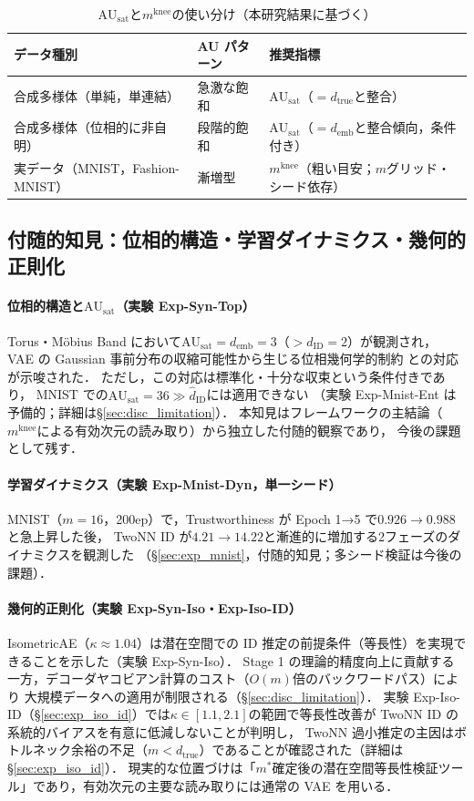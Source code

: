 \documentclass[11pt,a4paper]{jsarticle}
\newcommand{\dID}{d_{\mathrm{ID}}}
\newcommand{\dzopt}{m^*}
\newcommand{\dtrue}{d_{\mathrm{true}}}
\newcommand{\kap}{\kappa}
\newcommand{\AUsat}{\mathrm{AU}_{\mathrm{sat}}}
\newcommand{\mknee}{m^{\mathrm{knee}}}
\newcommand{\demb}{d_{\mathrm{emb}}}
\begin{document}
\begin{table}[H]
\centering
\caption{$\AUsat$と$\mknee$の使い分け（本研究結果に基づく）}
\label{tab:au_comparison}
\small
\begin{tabular}{lll}
\toprule
データ種別 & AU パターン & 推奨指標 \\
\midrule
合成多様体（単純，単連結） & 急激な飽和 & $\AUsat$（$= \dtrue$と整合） \\
合成多様体（位相的に非自明） & 段階的飽和 & $\AUsat$（$= \demb$と整合傾向，条件付き） \\
実データ（MNIST，Fashion-MNIST） & 漸増型 & $\mknee$（粗い目安；$m$グリッド・シード依存） \\
\bottomrule
\end{tabular}
\end{table}

\subsection{付随的知見：位相的構造・学習ダイナミクス・幾何的正則化}\label{sec:disc_incidental}

\paragraph{位相的構造と$\AUsat$（実験 Exp-Syn-Top）}
Torus・Möbius Band において$\AUsat = \demb = 3$（$> \dID = 2$）が観測され，
VAE の Gaussian 事前分布の収縮可能性から生じる位相幾何学的制約
\cite{hatcher2002algebraic,guillemin1974differential}との対応が示唆された．
ただし，この対応は標準化・十分な収束という条件付きであり，
MNIST での$\AUsat = 36 \gg \hat{d}_\mathrm{ID}$には適用できない
（実験 Exp-Mnist-Ent は予備的；詳細は§\ref{sec:disc_limitation}）．
本知見はフレームワークの主結論（$\mknee$による有効次元の読み取り）から独立した付随的観察であり，
今後の課題として残す．

\paragraph{学習ダイナミクス（実験 Exp-Mnist-Dyn，単一シード）}
MNIST（$m=16$，200ep）で，Trustworthiness が Epoch 1→5 で$0.926 \to 0.988$と急上昇した後，
TwoNN ID が$4.21 \to 14.22$と漸進的に増加する2フェーズのダイナミクスを観測した
（§\ref{sec:exp_mnist}，付随的知見；多シード検証は今後の課題）．

\paragraph{幾何的正則化（実験 Exp-Syn-Iso・Exp-Iso-ID）}
IsometricAE（$\kap \approx 1.04$）は潜在空間での ID 推定の前提条件（等長性）を実現できることを示した（実験 Exp-Syn-Iso）．
Stage 1 の理論的精度向上に貢献する一方，デコーダヤコビアン計算のコスト（$O(m)$倍のバックワードパス）により
大規模データへの適用が制限される（§\ref{sec:disc_limitation}）．
実験 Exp-Iso-ID（§\ref{sec:exp_iso_id}）では$\kap \in [1.1, 2.1]$の範囲で等長性改善が TwoNN ID の系統的バイアスを有意に低減しないことが判明し，
TwoNN 過小推定の主因はボトルネック余裕の不足（$m < d_\mathrm{true}$）であることが確認された（詳細は§\ref{sec:exp_iso_id}）．
現実的な位置づけは「$\dzopt$確定後の潜在空間等長性検証ツール」であり，有効次元の主要な読み取りには通常の VAE を用いる．
\end{document}
